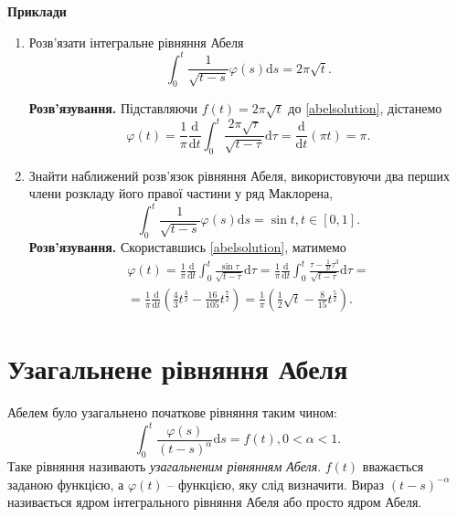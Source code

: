 \documentclass[14pt,twoside]{extreport}
\theoremstyle{mystyle}
\numberwithin{equation}{chapter}
\begin{document}
\begin{small}
\textbf{Приклади}
\begin{enumerate}
	\item Розв'язати інтегральне рівняння Абеля
	\begin{equation}
	\int_{0}^{t}\frac{1}{\sqrt{t-s}}\varphi(s)\mathrm{d}s = 2\displaystyle \pi\sqrt{t}.
	\end{equation}
	
	\textbf{Розв'язування.}
	Підставляючи $f(t)=2\pi\sqrt{t}$ до \eqref{abelsolution}, дістанемо
	\begin{equation}
	\varphi(t)=\displaystyle \frac{1}{\pi}\frac{\mathrm{d}}{\mathrm{d}t}\int_{0}^{t}\frac{2\pi\sqrt{\tau}}{\sqrt{t-\tau}}\mathrm{d}\tau=\frac{\mathrm{d}}{\mathrm{d}t}(\pi t)=\pi.
	\end{equation}
	
	\item Знайти наближений розв'язок рівняння Абеля, використовуючи два перших члени розкладу його правої частини у ряд Маклорена,
	\begin{equation}
	\displaystyle \int_{0}^{t}\frac{1}{\sqrt{t-s}}\varphi(s)\mathrm{d}s = \sin t, t\in[0,1].
	\end{equation}
	\textbf{Розв'язування.}
	Скориставшись \eqref{abelsolution}, матимемо
	\begin{multline*}
	\varphi(t)=\frac{1}{\pi}\frac{\mathrm{d}}{\mathrm{d}t}\int_{0}^{t}\frac{\sin \tau}{\sqrt{t-\tau}}\mathrm{d}\tau=\frac{1}{\pi}\frac{\mathrm{d}}{\mathrm{d}t}\int_{0}^{t}\frac{\tau-\frac{1}{3!}\tau^{3}}{\sqrt{t-\tau}}\mathrm{d}\tau=\\
	=\frac{1}{\pi}\frac{\mathrm{d}}{\mathrm{d}t}\left(\frac{4}{3}t^{\frac{3}{2}}-\frac{16}{105}t^{\frac{7}{2}}\right)=\frac{1}{\pi}\left(\frac{1}{2}\sqrt{t}-\frac{8}{15}t^{\frac{5}{2}}\right).
	\end{multline*}
\end{enumerate}
\end{small}

\section{Узагальнене рівняння Абеля}

Абелем було узагальнено початкове рівняння таким чином:
\begin{equation}\label{genabeleq}
	\displaystyle \int_{0}^{t}\frac{\varphi(s)}{(t-s)^{\alpha}}\mathrm{d}s = f(t), 0<\alpha<1.
\end{equation}
Таке рівняння називають \emph{узагальненим рівнянням Абеля}. $f(t)$ вважається заданою функцією, а $\varphi(t)$ -- функцією, яку слід визначити. Вираз $(t-s)^{-\alpha}$ називається ядром інтегрального рівняння Абеля або просто ядром Абеля.
\end{document}
